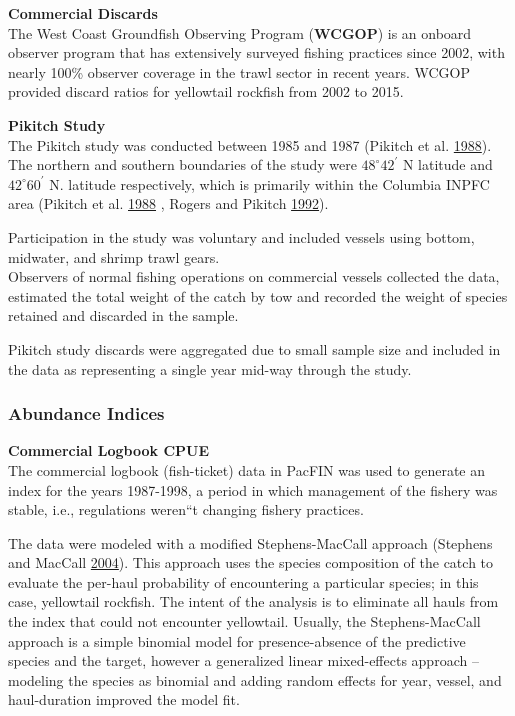 \documentclass[12pt,]{article}
\begin{document}
\textbf{Commercial Discards}\\
The West Coast Groundfish Observing Program (\textbf{WCGOP}) is an
onboard observer program that has extensively surveyed fishing practices
since 2002, with nearly 100\% observer coverage in the trawl sector in
recent years. WCGOP provided discard ratios for yellowtail rockfish from
2002 to 2015.

\textbf{Pikitch Study}\\
The Pikitch study was conducted between 1985 and 1987 (Pikitch et al.
\protect\hyperlink{ref-Pikitch1988}{1988}). The northern and southern
boundaries of the study were \(48^\circ 42^\prime\) N latitude and
\(42^\circ 60^\prime\) N. latitude respectively, which is primarily
within the Columbia INPFC area (Pikitch et al.
\protect\hyperlink{ref-Pikitch1988}{1988} , Rogers and Pikitch
\protect\hyperlink{ref-Rogers1992}{1992}).

Participation in the study was voluntary and included vessels using
bottom, midwater, and shrimp trawl gears.\\
Observers of normal fishing operations on commercial vessels collected
the data, estimated the total weight of the catch by tow and recorded
the weight of species retained and discarded in the sample.

Pikitch study discards were aggregated due to small sample size and
included in the data as representing a single year mid-way through the
study.

\subsubsection{Abundance Indices}\label{abundance-indices}

\textbf{Commercial Logbook CPUE}\\
The commercial logbook (fish-ticket) data in PacFIN was used to generate
an index for the years 1987-1998, a period in which management of the
fishery was stable, i.e., regulations weren``t changing fishery
practices.

The data were modeled with a modified Stephens-MacCall approach
(Stephens and MacCall \protect\hyperlink{ref-Stephens2004}{2004}). This
approach uses the species composition of the catch to evaluate the
per-haul probability of encountering a particular species; in this case,
yellowtail rockfish. The intent of the analysis is to eliminate all
hauls from the index that could not encounter yellowtail. Usually, the
Stephens-MacCall approach is a simple binomial model for
presence-absence of the predictive species and the target, however a
generalized linear mixed-effects approach -- modeling the species as
binomial and adding random effects for year, vessel, and haul-duration
improved the model fit.
\end{document}
